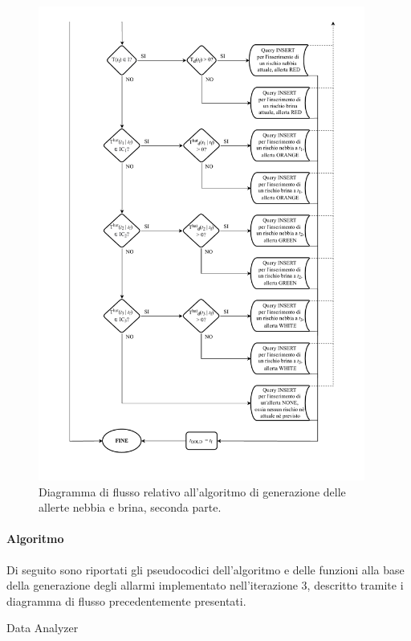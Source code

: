 \begin{figure}[h!]
	\centering
	\includegraphics[height=590px]{./Iterazione 3/OtherFiles/FC - Generatore allerte F&F(2).pdf}
	\caption{Diagramma di flusso relativo all'algoritmo di generazione delle allerte nebbia e brina, seconda parte.}
	\label{fig:FFFlowChart2}
\end{figure}

\clearpage

\paragraph{Algoritmo}
Di seguito sono riportati gli pseudocodici dell'algoritmo e delle funzioni alla base della generazione degli allarmi implementato nell'iterazione 3, descritto tramite i diagramma di flusso precedentemente presentati.

\begin{algorithm}
	\caption{Data Analyzer}
\label{alg:1}
\end{algorithm}


